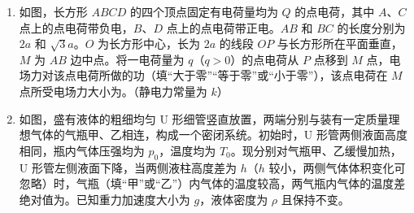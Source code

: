 \documentclass[\gkver]{gaokaozhenti}
\begin{document}
\begin{enumerate}
{（2）玻璃板 Ⅰ 和 Ⅱ 镜像对称，绿光经过 Ⅰ 的向上侧移会被玻璃板 Ⅱ 的向下侧移完全抵消，最终出射光与原虚线重合。换成红光时，根据对称性，玻璃板 Ⅰ 对红光的向上侧移量仍等于玻璃板 Ⅱ 对红光的向下侧移量，因此从玻璃板 Ⅱ 出射的光会与虚线重合。
}

\item
如图，长方形 $ABCD$ 的四个顶点固定有电荷量均为 $Q$ 的点电荷，其中 $A$、$C$ 点上的点电荷带负电，$B$、$D$ 点上的点电荷带正电。$AB$ 和 $BC$ 的长度分别为 $2a$ 和 $\sqrt3a$。$O$ 为长方形中心，长为 $2a$ 的线段 $OP$ 与长方形所在平面垂直，$M$ 为 $AB$ 边中点。将一电荷量为 $q$（$q>0$）的点电荷从 $P$ 点移到 $M$ 点，电场力对该点电荷所做的功（填“大于零”“等于零”或“小于零”），该点电荷在 $M$ 点所受电场力大小为。（静电力常量为 $k$）

\item
如图，盛有液体的粗细均匀 U 形细管竖直放置，两端分别与装有一定质量理想气体的气瓶甲、乙相连，构成一个密闭系统。初始时，U 形管两侧液面高度相同，瓶内气体压强均为 $p_0$，温度均为 $T_0$。现分别对气瓶甲、乙缓慢加热，U 形管左侧液面下降，当两侧液柱高度差为 $h$（$h$ 较小，两侧气体体积变化可忽略）时，气瓶（填“甲”或“乙”）内气体的温度较高，两气瓶内气体的温度差绝对值为。已知重力加速度大小为 $g$，液体密度为 $\rho$ 且保持不变。
\end{enumerate}
\end{document}

